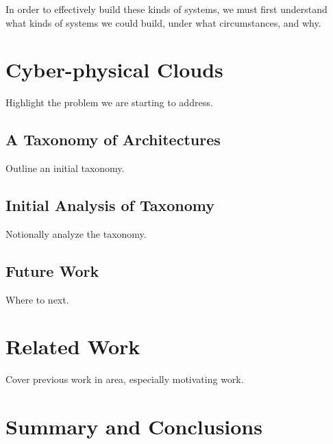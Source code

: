 \documentclass{sig-alternate}
\begin{document}
In order to effectively build these kinds of systems, we must first understand what kinds of systems we could build, under what circumstances, and why.  

\section{Cyber-physical Clouds}
Highlight the problem we are starting to address.

\subsection{A Taxonomy of Architectures}
Outline an initial taxonomy.

\subsection{Initial Analysis of Taxonomy}
Notionally analyze the taxonomy.

\subsection{Future Work}
Where to next.

\section{Related Work}
Cover previous work in area, especially motivating work.

\section{Summary and Conclusions}




\end{document}
